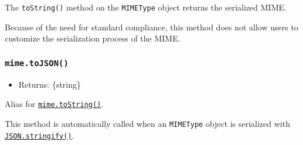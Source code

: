 The \texttt{toString()} method on the \texttt{MIMEType} object returns
the serialized MIME.

Because of the need for standard compliance, this method does not allow
users to customize the serialization process of the MIME.

\subsubsection{\texorpdfstring{\texttt{mime.toJSON()}}{mime.toJSON()}}\label{mime.tojson}

\begin{itemize}
\tightlist
\item
  Returns: \{string\}
\end{itemize}

Alias for \hyperref[mimetostring]{\texttt{mime.toString()}}.

This method is automatically called when an \texttt{MIMEType} object is
serialized with
\href{https://developer.mozilla.org/en-US/docs/Web/JavaScript/Reference/Global_Objects/JSON/stringify}{\texttt{JSON.stringify()}}.

\begin{Shaded}
\begin{Highlighting}[]
 \OperatorTok{;}

\OperatorTok{=}\NormalTok{ [}
   \NormalTok{(}\NormalTok{)}\OperatorTok{,}
   \NormalTok{(}\NormalTok{)}\OperatorTok{,}
\NormalTok{]}\OperatorTok{;}
\NormalTok{(}\OperatorTok{;}
\end{Highlighting}
\end{Shaded}

\begin{Shaded}
\begin{Highlighting}[]
\OperatorTok{=} \NormalTok{(}\NormalTok{)}\OperatorTok{;}

\OperatorTok{=}\NormalTok{ [}
   \NormalTok{(}\NormalTok{)}\OperatorTok{,}
   \NormalTok{(}\NormalTok{)}\OperatorTok{,}
\NormalTok{]}\OperatorTok{;}
\NormalTok{(}\OperatorTok{;}
\end{Highlighting}
\end{Shaded}

